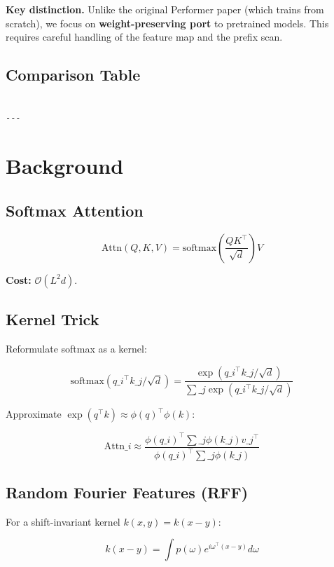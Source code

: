 \textbf{Key distinction.} Unlike the original Performer paper (which trains from 
scratch), we focus on \textbf{weight-preserving port} to pretrained models. This 
requires careful handling of the feature map and the prefix scan.



\subsection{Comparison Table}

\begin{lstlisting}

---
\end{lstlisting}


\section{Background}

\subsection{Softmax Attention}

\[
\text{Attn}(Q, K, V) = \text{softmax}\!\left(\frac{QK^\top}{\sqrt{d}}\right)V
\tag{3.1}
\]

\textbf{Cost:} $\mathcal{O}(L^2 d)$.

\subsection{Kernel Trick}

Reformulate softmax as a kernel:

\[
\text{softmax}(q\_i^\top k\_j / \sqrt{d}) = \frac{\exp(q\_i^\top k\_j / \sqrt{d})}{\sum\_j \exp(q\_i^\top k\_j / \sqrt{d})}
\tag{3.2}
\]

Approximate $\exp(q^\top k) \approx \phi(q)^\top \phi(k)$:

\[
\text{Attn}\_i \approx \frac{\phi(q\_i)^\top \sum\_j \phi(k\_j) v\_j^\top}{\phi(q\_i)^\top \sum\_j \phi(k\_j)}
\tag{3.3}
\]

\subsection{Random Fourier Features (RFF)}

For a shift-invariant kernel $k(x, y) = k(x - y)$:

\[
k(x - y) = \int p(\omega) e^{i \omega^\top (x - y)} d\omega
\tag{3.4}
\]


